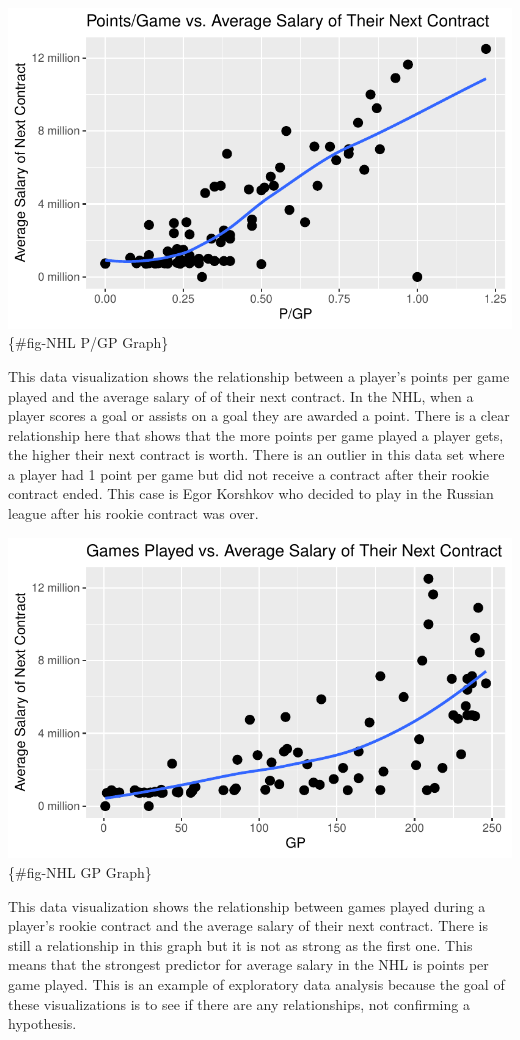 \documentclass[
  letterpaper,
  DIV=11,
  numbers=noendperiod]{scrartcl}
\begin{document}
\includegraphics{final_qmd_file_files/figure-pdf/fig-NHL P/GP Graph-1.pdf}\{\#fig-NHL
P/GP Graph\}

This data visualization shows the relationship between a player's points
per game played and the average salary of of their next contract. In the
NHL, when a player scores a goal or assists on a goal they are awarded a
point. There is a clear relationship here that shows that the more
points per game played a player gets, the higher their next contract is
worth. There is an outlier in this data set where a player had 1 point
per game but did not receive a contract after their rookie contract
ended. This case is Egor Korshkov who decided to play in the Russian
league after his rookie contract was over.

\includegraphics{final_qmd_file_files/figure-pdf/fig-NHL GP Graph-1.pdf}\{\#fig-NHL
GP Graph\}

This data visualization shows the relationship between games played
during a player's rookie contract and the average salary of their next
contract. There is still a relationship in this graph but it is not as
strong as the first one. This means that the strongest predictor for
average salary in the NHL is points per game played. This is an example
of exploratory data analysis because the goal of these visualizations is
to see if there are any relationships, not confirming a hypothesis.
\end{document}
